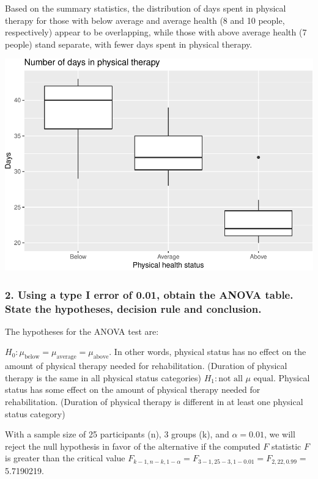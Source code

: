 \documentclass[]{article}
\begin{document}
Based on the summary statistics, the distribution of days spent in
physical therapy for those with below average and average health (8 and
10 people, respectively) appear to be overlapping, while those with
above average health (7 people) stand separate, with fewer days spent in
physical therapy.

\includegraphics{hw3_files/figure-latex/unnamed-chunk-7-1.pdf}

\subsubsection{2. Using a type I error of 0.01, obtain the ANOVA table.
State the hypotheses, decision rule and
conclusion.}\label{using-a-type-i-error-of-0.01-obtain-the-anova-table.-state-the-hypotheses-decision-rule-and-conclusion.}

The hypotheses for the ANOVA test are:

\(H_0: \mu_{\text{below}} = \mu_{\text{average}} = \mu_{\text{above}}\).
In other words, physical status has no effect on the amount of physical
therapy needed for rehabilitation. (Duration of physical therapy is the
same in all physical status categories)
\(H_1: \text{not all } \mu \text{ equal.}\) Physical status has some
effect on the amount of physical therapy needed for rehabilitation.
(Duration of physical therapy is different in at least one physical
status category)

With a sample size of 25 participants (n), 3 groups (k), and
\(\alpha = 0.01\), we will reject the null hypothesis in favor of the
alternative if the computed \(F\) statistic \(F\) is greater than the
critical value
\(F_{k-1, n-k, 1-\alpha} = F_{3-1,25-3,1-0.01} = F_{2,22,0.99} =\)
5.7190219.
\end{document}
